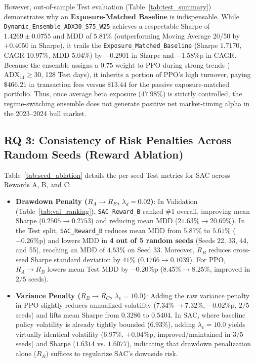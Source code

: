 \documentclass[10pt,twocolumn,conference]{IEEEtran}
\begin{document}
However, out-of-sample Test evaluation (Table~\ref{tab:test_summary}) demonstrates why an \textbf{Exposure-Matched Baseline} is indispensable. While \texttt{Dynamic\_Ensemble\_ADX30\_S75\_W25} achieves a respectable Sharpe of $1.4269 \pm 0.0755$ and MDD of $5.81\%$ (outperforming Moving Average 20/50 by $+0.4050$ in Sharpe), it trails the \texttt{Exposure\_Matched\_Baseline} (Sharpe $1.7170$, CAGR $10.97\%$, MDD $5.04\%$) by $-0.2901$ in Sharpe and $-1.58\%$p in CAGR. Because the ensemble assigns a $0.75$ weight to PPO during strong trends ($\text{ADX}_{14} \ge 30$, 128 Test days), it inherits a portion of PPO's high turnover, paying $\$466.21$ in transaction fees versus $\$13.44$ for the passive exposure-matched portfolio. Thus, once average beta exposure ($47.98\%$) is strictly controlled, the regime-switching ensemble does not generate positive net market-timing alpha in the 2023--2024 bull market.

\subsection{RQ 3: Consistency of Risk Penalties Across Random Seeds (Reward Ablation)}
Table~\ref{tab:seed_ablation} details the per-seed Test metrics for SAC across Rewards A, B, and C:
\begin{itemize}
    \item \textbf{Drawdown Penalty ($R_A \rightarrow R_B$, $\lambda_d = 0.02$)}: In Validation (Table~\ref{tab:val_ranking}), \texttt{SAC\_Reward\_B} ranked \#1 overall, improving mean Sharpe ($0.2505 \rightarrow 0.2753$) and reducing mean MDD ($21.63\% \rightarrow 20.69\%$). In the Test split, \texttt{SAC\_Reward\_B} reduces mean MDD from $5.87\%$ to $5.61\%$ ($-0.26\%$p) and lowers MDD in \textbf{4 out of 5 random seeds} (Seeds 22, 33, 44, and 55), reaching an MDD of $4.53\%$ on Seed 33. Moreover, $R_B$ reduces cross-seed Sharpe standard deviation by $41\%$ ($0.1766 \rightarrow 0.1039$). For PPO, $R_A \rightarrow R_B$ lowers mean Test MDD by $-0.20\%$p ($8.45\% \rightarrow 8.25\%$, improved in $2/5$ seeds).
    \item \textbf{Variance Penalty ($R_B \rightarrow R_C$, $\lambda_v = 10.0$)}: Adding the raw variance penalty in PPO slightly reduces annualized volatility ($7.34\% \rightarrow 7.32\%$, $-0.02\%$p, $2/5$ seeds) and lifts mean Sharpe from $0.3286$ to $0.5404$. In SAC, where baseline policy volatility is already tightly bounded ($6.93\%$), adding $\lambda_v = 10.0$ yields virtually identical volatility ($6.97\%$, $+0.04\%$p, improved/maintained in $3/5$ seeds) and Sharpe ($1.6314$ vs. $1.6077$), indicating that drawdown penalization alone ($R_B$) suffices to regularize SAC's downside risk.
\end{itemize}
\end{document}
